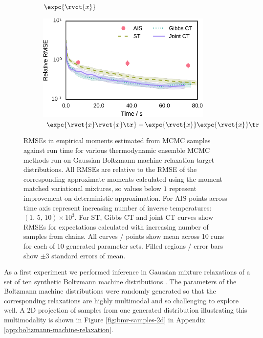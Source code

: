 \begin{figure}[t]
\begin{subfigure}[b]{.33\linewidth}
\caption{$\expc{\rvct{x}}$}\label{sfig:bmr-30-unit-scale-6-mean}
\end{subfigure}
\begin{subfigure}[b]{.33\linewidth}
\vskip 0pt
\centering
\includegraphics[width=0.95\textwidth]{images/continuous-tempering/gaussian-bm-relaxation-30-unit-scale-6-covariance-rmses-t2} 
\caption{$\expc{\rvct{x}\rvct{x}\tr} - \expc{\rvct{x}}\expc{\rvct{x}}\tr$}\label{sfig:bmr-30-unit-scale-6-covar}
\end{subfigure}
\caption[Boltzmann machine relaxation results.]{\acp{RMSE} in empirical moments estimated from \ac{MCMC} samples against run time for various thermodynamic ensemble \ac{MCMC} methods run on Gaussian Boltzmann machine relaxation target distributions. All RMSEs are relative to the RMSE of the corresponding approximate moments calculated using the moment-matched variational mixtures, so values below $1$ represent improvement on deterministic approximation. For \ac{AIS} points across time axis represent increasing number of inverse temperatures: $(1,\, 5,\,10)\times 10^3$. For \ac{ST}, Gibbs \ac{CT} and joint \ac{CT} curves show RMSEs for expectations calculated with increasing number of samples from chains. All curves / points show mean across 10 runs for each of 10 generated parameter sets. Filled regions / error bars show $\pm 3$ standard errors of mean.}
\label{fig:bmr-30-unit-scale-6-results}
\end{figure}

As a first experiment we performed inference in Gaussian mixture relaxations of a set of ten synthetic Boltzmann machine distributions \citep{zhang2012continuous}. The parameters of the Boltzmann machine distributions were randomly generated so that the corresponding relaxations are highly multimodal and so challenging to explore well. A 2D projection of samples from one generated distribution illustrating this multimodality is shown in Figure \ref{fig:bmr-samples-2d} in Appendix \ref{app:boltzmann-machine-relaxation}.

